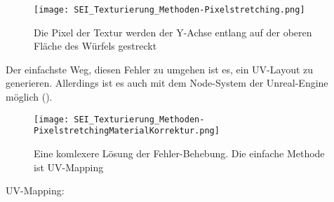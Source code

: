 \begin{figure}[H]
    \centering
    \texttt{[image: SEI\_Texturierung\_Methoden-Pixelstretching.png]}
    \caption{Die Pixel der Textur werden der Y-Achse entlang auf der oberen Fläche des Würfels gestreckt}
    \label{picture:tex_streching}
\end{figure}

Der einfachste Weg, diesen Fehler zu umgehen ist es, ein UV-Layout zu generieren. Allerdings ist es auch mit dem
Node-System der Unreal-Engine\citep{ue:node_introduction} möglich ().


\begin{figure}[H]
    \centering
    \texttt{[image: SEI\_Texturierung\_Methoden-PixelstretchingMaterialKorrektur.png]}
    \caption{Eine komlexere Lösung der Fehler-Behebung. Die einfache Methode ist UV-Mapping}
    \label{picture:tex_streching_solve}
\end{figure}


UV-Mapping:

